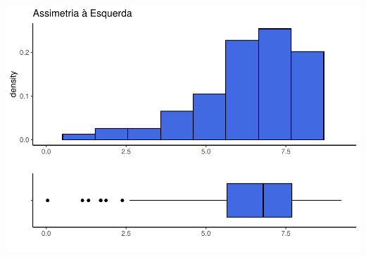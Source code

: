 \documentclass[
]{book}
\begin{document}
\begin{center}\includegraphics{AED_files/figure-latex/assimetriaE-1} \end{center}
\end{document}
